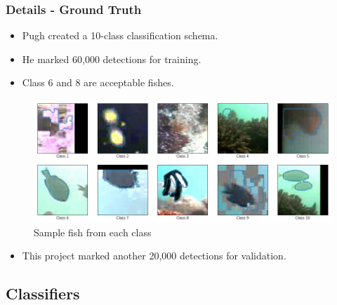\documentclass{beamer}[fullspacing]
\begin{document}
\begin{frame}
\frametitle{Details - Ground Truth}

\begin{itemize}
\item
Pugh created a 10-class classification schema.
\item
He marked 60,000 detections for training.
\item
Class 6 and 8 are acceptable fishes.
\end{itemize}

\begin{figure}
\includegraphics[scale=0.2]{image/class_sample.png}
\caption{Sample fish from each class}
\end{figure}

\vspace{-15pt}
\begin{itemize}
\item
This project marked  another 20,000 detections for validation.
\end{itemize}

\end{frame}



\subsection{Classifiers}
\end{document}
